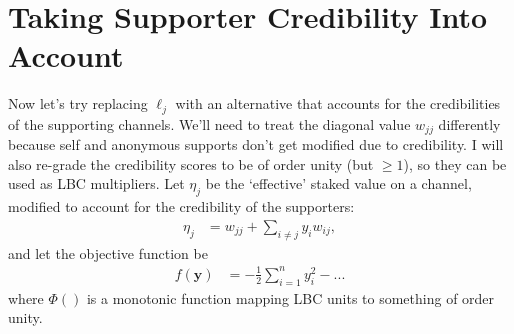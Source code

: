 \documentclass[a4paper, 12pt]{article}
\begin{document}
\section{Taking Supporter Credibility Into Account}
Now let's try replacing $\ell_j$ with an alternative that accounts for the
credibilities of the supporting channels. We'll need to treat the diagonal
value $w_{jj}$ differently because self and anonymous supports don't get
modified due to credibility. I will also re-grade the credibility scores
to be of order unity (but $\geq 1$), so they can be used as LBC multipliers.
Let $\eta_j$ be the `effective' staked value on a channel, modified to account
for the credibility of the supporters:
\begin{align}
\eta_j &= w_{jj} + \sum_{i \neq j} y_i w_{ij},
\end{align}
and let the objective function be
\begin{align}
f(\boldsymbol{y}) &= -\frac{1}{2}\sum_{i=1}^n y_i^2
                     - ...
\end{align}
where $\Phi()$ is a monotonic function mapping LBC units to something of order
unity.




\end{document}
